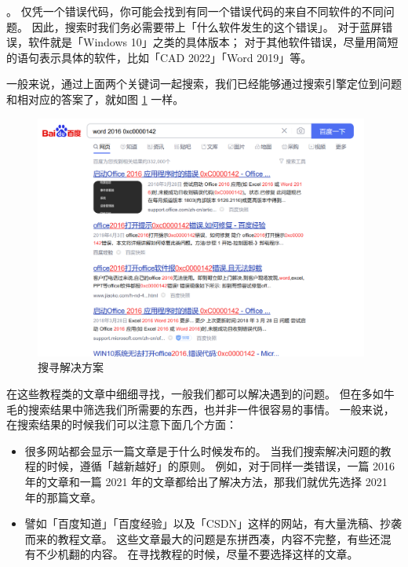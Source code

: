 。
仅凭一个错误代码，你可能会找到有同一个错误代码的来自不同软件的不同问题。
因此，搜索时我们务必需要带上「什么软件发生的这个错误」。
对于蓝屏错误，软件就是「Windows 10」之类的具体版本；
对于其他软件错误，尽量用简短的语句表示具体的软件，比如「CAD 2022」「Word 2019」等。

一般来说，通过上面两个关键词一起搜索，我们已经能够通过搜索引擎定位到问题和相对应的答案了，就如图 \ref{Find_Solutions} 一样。

\begin{figure}[htb!]
  \centering
  \includegraphics[width=11cm]{assets/Find_Solutions.png}
  \caption{搜寻解决方案}
  \label{Find_Solutions}
\end{figure}

在这些教程类的文章中细细寻找，一般我们都可以解决遇到的问题。
但在多如牛毛的搜索结果中筛选我们所需要的东西，也并非一件很容易的事情。
一般来说，在搜索结果的时候我们可以注意下面几个方面：

\begin{itemize}
  \item {}
    很多网站都会显示一篇文章是于什么时候发布的。
    当我们搜索解决问题的教程的时候，遵循「越新越好」的原则。
    例如，对于同样一类错误，一篇 2016 年的文章和一篇 2021 年的文章都给出了解决方法，那我们就优先选择 2021 年的那篇文章。
  \item {}
    譬如「百度知道」「百度经验」以及「CSDN」这样的网站，有大量洗稿、抄袭而来的教程文章。
    这些文章最大的问题是东拼西凑，内容不完整，有些还混有不少机翻的内容。
    在寻找教程的时候，尽量不要选择这样的文章。
\end{itemize}

\practice

